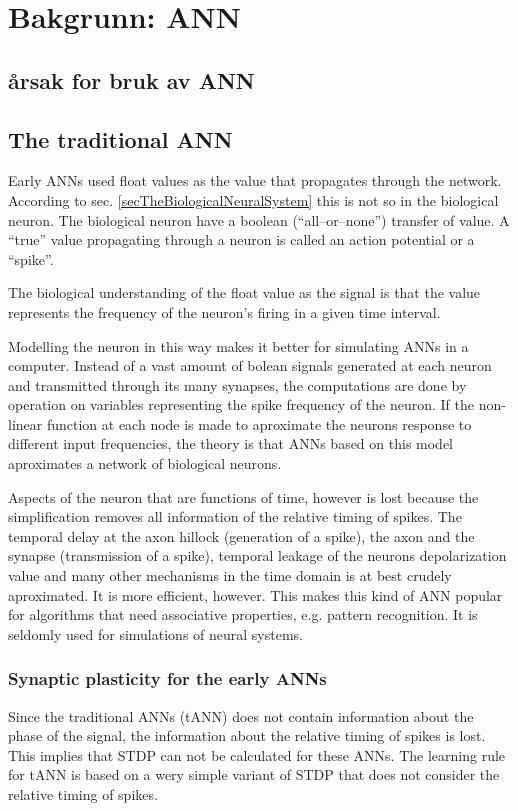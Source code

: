 \section{Bakgrunn: ANN}
	\subsection{årsak for bruk av ANN}
	
	\subsection{The traditional ANN}
Early ANNs used float values as the value that propagates through the network. According to sec. \ref{secTheBiologicalNeuralSystem} this is not so in the biological neuron.
The biological neuron have a boolean (``all--or--none'') transfer of value. A ``true'' value propagating through a neuron is called an action potential or a ``spike''.

The biological understanding of the float value as the signal is that the value represents the frequency of the neuron's firing in a given time interval.

Modelling the neuron in this way makes it better for simulating ANNs in a computer. 
Instead of a vast amount of bolean signals generated at each neuron and transmitted through its many synapses, the computations are done by operation on variables representing the spike frequency of the neuron.
If the non-linear function at each node is made to aproximate the neurons response to different input frequencies, the theory is that ANNs based on this model aproximates a network of biological neurons.

Aspects of the neuron that are functions of time, however is lost because the simplification removes all information of the relative timing of spikes.
The temporal delay at the axon hillock (generation of a spike), the axon and the synapse (transmission of a spike), temporal leakage of the neurons depolarization value and many other mechanisms in the time domain is at best crudely aproximated.
It is more efficient, however. This makes this kind of ANN popular for algorithms that need associative properties, e.g. pattern recognition. It is seldomly used for simulations of neural systems.


		\subsubsection{Synaptic plasticity for the early ANNs}
Since the traditional ANNs (tANN) does not contain information about the phase of the signal, the information about the relative timing of spikes is lost. This implies that STDP can not be calculated for these ANNs. 
The learning rule for tANN is based on a wery simple variant of STDP that does not consider the relative timing of spikes.

